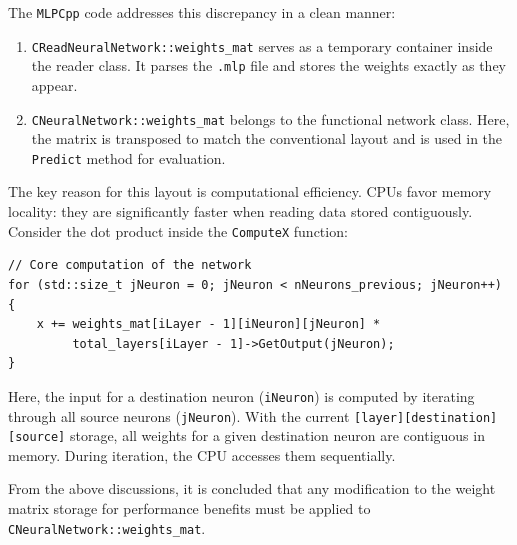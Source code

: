 \documentclass{article}
\begin{document}
The \texttt{MLPCpp} code addresses this discrepancy in a clean manner:  
\begin{enumerate}
    \item \texttt{CReadNeuralNetwork::weights\_mat} serves as a temporary container inside the reader class. It parses the \texttt{.mlp} file and stores the weights exactly as they appear.
    \item \texttt{CNeuralNetwork::weights\_mat} belongs to the functional network class. Here, the matrix is transposed to match the conventional layout and is used in the \texttt{Predict} method for evaluation.
\end{enumerate}

The key reason for this layout is computational efficiency. CPUs favor memory locality: they are significantly faster when reading data stored contiguously. Consider the dot product inside the \texttt{ComputeX} function:

\begin{verbatim}
// Core computation of the network
for (std::size_t jNeuron = 0; jNeuron < nNeurons_previous; jNeuron++) {
    x += weights_mat[iLayer - 1][iNeuron][jNeuron] *
         total_layers[iLayer - 1]->GetOutput(jNeuron);
}
\end{verbatim}

Here, the input for a destination neuron (\texttt{iNeuron}) is computed by iterating through all source neurons (\texttt{jNeuron}). With the current \texttt{[layer][destination][source]} storage, all weights for a given destination neuron are contiguous in memory. During iteration, the CPU accesses them sequentially. 

From the above discussions, it is concluded that any modification to the weight matrix storage for performance benefits must be applied to \texttt{CNeuralNetwork::weights\_mat}.
\end{document}

